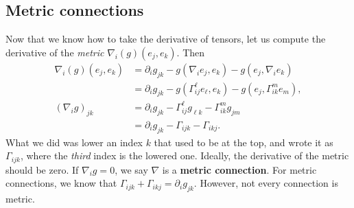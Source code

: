 \subsection{Metric connections}
Now that we know how to take the derivative of tensors, let us compute the derivative of the \emph{metric} $\nabla _i (g)(e_j,e_k)$. Then 
\begin{align*}
    \nabla _i (g)(e_j ,e_k)&= \partial _i g_{jk}-g(\nabla _i  e_j ,e_k)-g(e_j ,\nabla _i e_k)\\
                           &=\partial _i g_{jk}-g(\Gamma _{ij}^{\ell}e_{\ell},e_k)-g(e_j ,\Gamma _{ik}^{m}e_m),\\
    (\nabla _i g)_{jk}&=\partial _i g_{jk}-\Gamma _{ij}^{\ell}g_{\ell k}-\Gamma _{ik}^m g_{jm}\\
                      &=\partial _i g_{jk}-\Gamma _{ijk}-\Gamma _{ikj}.
\end{align*}
What we did was lower an index $k$ that used to be at the top, and wrote it as $\Gamma _{ijk}$, where the \emph{third} index is the lowered one. Ideally, the derivative of the metric should be zero. If $\nabla _i g=0$, we say $\nabla$ is a \textbf{metric connection}. For metric connections, we know that $\Gamma _{ijk}+\Gamma _{ikj}=\partial _i g_{jk}$. However, not every connection is metric.
